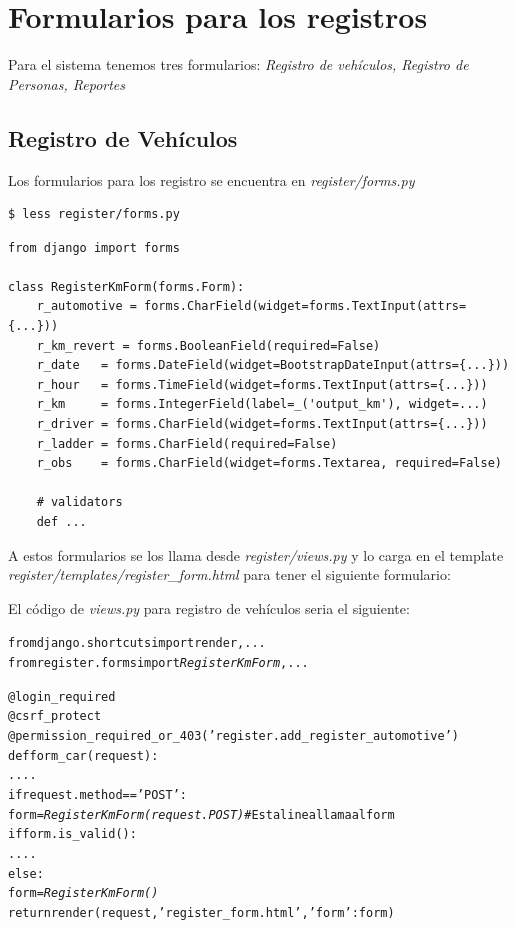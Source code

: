 \section{Formularios para los registros}
Para el sistema tenemos tres formularios: {\it Registro de vehículos, Registro
de Personas, Reportes}

\subsection{Registro de Vehículos}
Los formularios para los registro se encuentra en {\it register/forms.py}

\begin{verbatim}
$ less register/forms.py
\end{verbatim}

\begin{verbatim}
from django import forms

class RegisterKmForm(forms.Form):
    r_automotive = forms.CharField(widget=forms.TextInput(attrs={...}))
    r_km_revert = forms.BooleanField(required=False)
    r_date   = forms.DateField(widget=BootstrapDateInput(attrs={...}))
    r_hour   = forms.TimeField(widget=forms.TextInput(attrs={...}))
    r_km     = forms.IntegerField(label=_('output_km'), widget=...)
    r_driver = forms.CharField(widget=forms.TextInput(attrs={...}))
    r_ladder = forms.CharField(required=False)
    r_obs    = forms.CharField(widget=forms.Textarea, required=False)

    # validators
    def ...
\end{verbatim}
A estos formularios se los llama desde {\it register/views.py} y lo carga en el
template {\it register/templates/register\_form.html} para tener el siguiente
formulario:

El código de {\it views.py} para registro de vehículos seria el siguiente:

\begin{alltt}
from django.shortcuts import render, ...
from register.forms import \emph{RegisterKmForm}, ...

@login_required
@csrf_protect
@permission_required_or_403('register.add_register_automotive')
def form_car(request):
    ....
    if request.method == 'POST':
        form = \emph{RegisterKmForm(request.POST)} # Esta linea llama al form
        if form.is_valid():
            ....
    else:
      form = \emph{RegisterKmForm()}
    return render(request, 'register_form.html', {'form': form})
\end{alltt}

